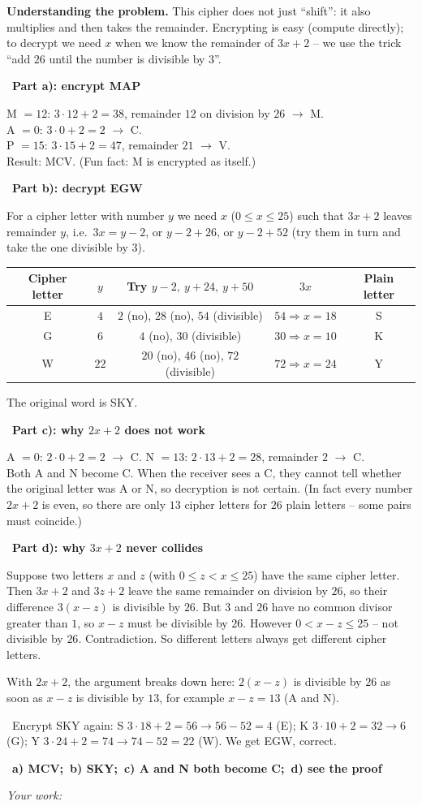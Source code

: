 \documentclass[11pt]{article}
\newif\ifsol \solfalse
\providecommand{\AnsWord}{Đáp số}
\newcommand{\StuProb}[2]{\begin{probboxS}{#1}{#2}\StuProbBody\end{probboxS}}
\newcommand{\ans}[1]{\par\smallskip{\bfseries\color{tmGreen!88!black}\AnsWord:}\ {\bfseries\color{AnsRed}#1}\par}
\newcommand{\probsol}[1]{%
  \begin{lrbox}{\solmeasure}\begin{minipage}{\dimexpr\linewidth-24pt\relax}#1\end{minipage}\end{lrbox}%
  \ifsol
    \begin{solbox}#1\end{solbox}%
  \else
    \setlength{\solht}{\dimexpr\ht\solmeasure+\dp\solmeasure+0.85cm\relax}%
    \ifdim\solht<1.35cm\setlength{\solht}{1.35cm}\fi
    \ifdim\solht>\StudentMaxWork\setlength{\solht}{\StudentMaxWork}\fi
    \par\noindent\begin{minipage}{\linewidth}%
    \expandafter\StuProb\StuProbArgs
    \begin{tcolorbox}[colback=white,colframe=Line,boxrule=0.8pt,arc=5pt,
      left=8pt,right=8pt,top=4pt,bottom=4pt,height=\solht]{\footnotesize\color{Slate}\itshape\WorkWord}\end{tcolorbox}%
    \end{minipage}\par\medskip
  \fi}
\newlength{\StudentMaxWork}\setlength{\StudentMaxWork}{4.5cm}
\newcommand{\step}[2]{\par\smallskip\noindent{\bfseries\color{tmBlue!85!black}\StepWord~#1.}\ {\bfseries #2}\par\nopagebreak}
\newcommand{\verify}[1]{\par\smallskip\noindent{\bfseries\color{tmGreen!80!black}\faCheckCircle\ \CheckWord}\ #1\par}
\def\WorkWord{Your work:}
\def\AnsWord{Answer}
\def\StepWord{Step}
\def\CheckWord{Check:}
\begin{document}
\probsol{
\textbf{Understanding the problem.} This cipher does not just ``shift'': it also multiplies and then takes the remainder. Encrypting is
easy (compute directly); to decrypt we need $x$ when we know the remainder of $3x + 2$ -- we use the trick ``add $26$ until the number
is divisible by $3$''.
\step{1}{Part a): encrypt \textsf{MAP}}
M $= 12$: $3\cdot 12 + 2 = 38$, remainder $12$ on division by $26$ $\to$ M.\\
A $= 0$: $3\cdot 0 + 2 = 2$ $\to$ C.\\
P $= 15$: $3\cdot 15 + 2 = 47$, remainder $21$ $\to$ V.\\
Result: \textsf{MCV}. (Fun fact: M is encrypted as itself.)
\step{2}{Part b): decrypt \textsf{EGW}}
For a cipher letter with number $y$ we need $x$ ($0 \le x \le 25$) such that $3x + 2$ leaves remainder $y$, i.e.\ $3x = y - 2$, or
$y - 2 + 26$, or $y - 2 + 52$ (try them in turn and take the one divisible by $3$).
\begin{center}\small
\begin{tabular}{|c|c|c|c|c|}
\hline
\rowcolor{tmBlue!10} Cipher letter & $y$ & Try $y - 2,\ y + 24,\ y + 50$ & $3x$ & Plain letter\\ \hline
E & $4$ & $2$ (no), $28$ (no), $54$ (divisible) & $54 \Rightarrow x = 18$ & S\\ \hline
G & $6$ & $4$ (no), $30$ (divisible) & $30 \Rightarrow x = 10$ & K\\ \hline
W & $22$ & $20$ (no), $46$ (no), $72$ (divisible) & $72 \Rightarrow x = 24$ & Y\\ \hline
\end{tabular}
\end{center}
The original word is \textsf{SKY}.
\step{3}{Part c): why $2x + 2$ does not work}
A $= 0$: $2\cdot 0 + 2 = 2$ $\to$ C. \quad N $= 13$: $2\cdot 13 + 2 = 28$, remainder $2$ $\to$ C.\\
Both A and N become C. When the receiver sees a C, they cannot tell whether the original letter was A or N, so decryption is not
certain. (In fact every number $2x + 2$ is even, so there are only $13$ cipher letters for $26$ plain letters -- some pairs must
coincide.)
\step{4}{Part d): why $3x + 2$ never collides}
\begin{proofbox}Suppose two letters $x$ and $z$ (with $0 \le z < x \le 25$) have the same cipher letter. Then $3x + 2$ and $3z + 2$ leave
the same remainder on division by $26$, so their difference $3(x - z)$ is divisible by $26$. But $3$ and $26$ have no common divisor
greater than $1$, so $x - z$ must be divisible by $26$. However $0 < x - z \le 25$ -- not divisible by $26$. Contradiction. So
different letters always get different cipher letters.\end{proofbox}
\begin{warnbox}With $2x + 2$, the argument breaks down here: $2(x - z)$ is divisible by $26$ as soon as $x - z$ is divisible by $13$,
for example $x - z = 13$ (A and N).\end{warnbox}
\verify{Encrypt \textsf{SKY} again: S $3\cdot 18 + 2 = 56 \to 56 - 52 = 4$ (E); K $3\cdot 10 + 2 = 32 \to 6$ (G); Y $3\cdot 24 + 2 = 74 \to 74 - 52 = 22$ (W). We get
\textsf{EGW}, correct.}
\ans{a) \textsf{MCV};\ b) \textsf{SKY};\ c) A and N both become C;\ d) see the proof}
}
\end{document}
